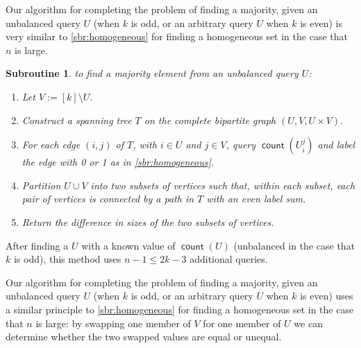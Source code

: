 \documentclass[11pt]{llncs}
\newcommand{\qcount}{\operatorname{\mathsf{count}}}
\newcommand{\assign}{:=}
\newtheorem{subroutine}{Subroutine}
\begin{document}
Our algorithm for completing the problem of finding a majority, given an unbalanced query $U$ (when $k$ is odd, or an arbitrary query $U$ when $k$ is even) is very similar to \autoref{sbr:homogeneous} for finding a homogeneous set in the case that $n$ is large.

\begin{subroutine} to find a majority element from an unbalanced query $U$:
\begin{enumerate}
\item Let $V\assign[k]\setminus U$.
\item Construct a spanning tree $T$ on the complete bipartite graph $(U,V,U\times V)$.
\item For each edge $(i,j)$ of $T$, with $i\in U$ and $j\in V$, query $\qcount(U_i^j)$ and label the edge with 0 or 1 as in \autoref{sbr:homogeneous}.
\item Partition $U\cup V$ into two subsets of vertices such that, within each subset, each pair of vertices is connected by a path in $T$ with an even label sum.
\item Return the difference in sizes of the two subsets of vertices. 
\end{enumerate}
\end{subroutine}

After finding a $U$ with a known value of $\qcount(U)$ (unbalanced in the case that $k$ is odd),
this method uses $n-1\le 2k-3$ additional queries.

\ifFull
\else


Our algorithm for completing the problem of finding a majority, given an unbalanced query $U$ (when $k$ is odd, or an arbitrary query $U$ when $k$ is even) uses a similar principle to \autoref{sbr:homogeneous} for finding a homogeneous set in the case that $n$ is large: by swapping one member of $V$ for one member of $U$ we can determine whether the two swapped values are equal or unequal.
\end{document}
